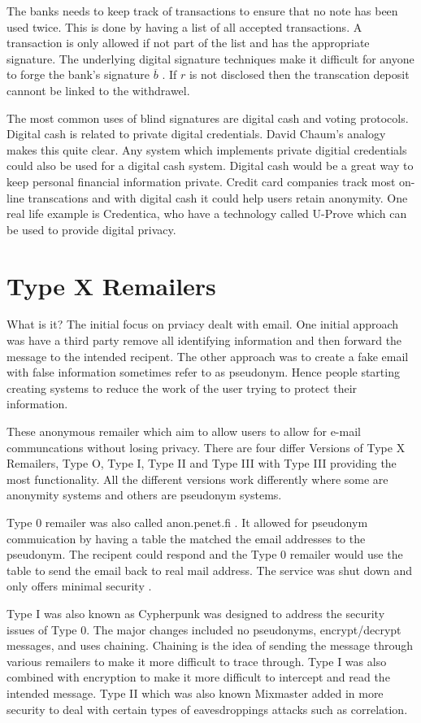 \documentclass[12pt]{article}
\begin{document}
The banks needs to keep track of transactions to ensure that no note has been used twice. This is done by having a list of all accepted transactions. A transaction is only allowed if not part of the list and has the appropriate signature. The underlying digital signature techniques make it difficult for anyone to forge the bank's signature $\overline{b}$ \cite{Chaum}. If $r$ is not disclosed then the transcation deposit cannont be linked to the withdrawel.

The most common uses of blind signatures are digital cash and voting protocols. Digital cash is related to private digital credentials. David Chaum's analogy makes this quite clear. Any system which implements private digitial credentials could also be used for a digital cash system. Digital cash would be a great way to keep personal financial information private. Credit card companies track most on-line transcations and with digital cash it could help users retain anonymity. One real life example is Credentica, who have a technology called U-Prove which can be used to provide digital privacy.

\section{Type X Remailers}\label{sec:type-x}
What is it?
The initial focus on prviacy dealt with email. One initial approach was have a third party remove all identifying information and then forward the message to the intended recipent. The other approach was to create a fake email with false information sometimes refer to as pseudonym. Hence people starting creating systems to reduce the work of the user trying to protect their information.

These anonymous remailer which aim to allow users to allow for e-mail communcations without losing privacy. There are four differ Versions of Type X Remailers, Type O, Type I, Type II and Type III with Type III providing the most functionality. All the different versions work differently where some are anonymity systems and others are pseudonym systems.

Type 0 remailer was also called anon.penet.fi \cite{GoldbertTwo}. It allowed for pseudonym commuication by having a table the matched the email addresses to the pseudonym. The recipent could respond and the Type 0 remailer would use the table to send the email back to real mail address. The service was shut down and only offers minimal security \cite{GoldbertTwo}.

Type I was also known as Cypherpunk was designed to address the security issues of Type 0. The major changes included no pseudonyms, encrypt/decrypt messages, and uses chaining. Chaining is the idea of sending the message through various remailers to make it more difficult to trace through. Type I was also combined with encryption to make it more difficult to intercept and read the intended message. Type II which was also known  Mixmaster added in more security to deal with certain types of eavesdroppings attacks such as correlation. 
\end{document}
